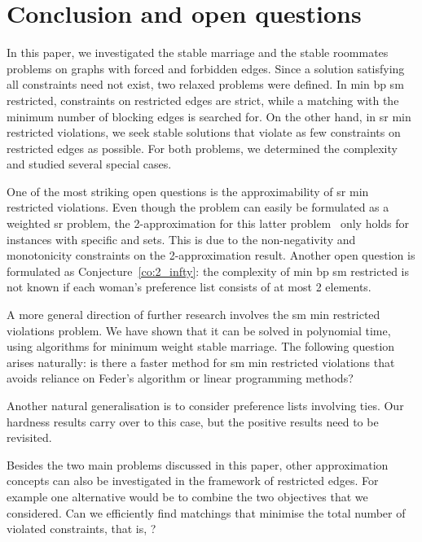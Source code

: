 \documentclass[preprint,12pt]{elsarticle}
\begin{document}
\section{Conclusion and open questions}
\label{sec:conc}
    In this paper, we investigated the stable marriage and the stable roommates problems on graphs with forced and forbidden edges. Since a solution satisfying all constraints need not exist, two relaxed problems were defined. In {\sc min bp sm restricted}, constraints on restricted edges are strict, while a matching with the  minimum number of blocking edges is searched for. On the other hand, in {\sc sr min restricted violations}, we seek stable solutions that violate as few constraints on restricted edges as possible. For both problems, we determined the complexity and studied several special cases.
    
One of the most striking open questions is the approximability of {\sc sr min restricted violations}. Even though the problem can easily be formulated as a weighted {\sc sr} problem, the 2-approximation for this latter problem~\cite{TS97,TS98} only holds for instances with specific  and  sets. This is due to the non-negativity and monotonicity constraints on the 2-approximation result. Another open question is formulated as Conjecture~\ref{co:2_infty}: the complexity of {\sc min bp sm restricted} is not known if each woman's preference list consists of at most 2 elements.

A more general direction of further research involves the {\sc sm min restricted violations} problem. We have shown that it can be solved in polynomial time, using algorithms for minimum weight stable marriage. The following question arises naturally: is there a faster method for {\sc sm min restricted violations} that avoids reliance on Feder's algorithm or linear programming methods?

Another natural generalisation is to consider preference lists involving ties. Our hardness results carry over to this case, but the positive results need to be revisited.

Besides the two main problems discussed in this paper, other approximation concepts can also be investigated in the framework of restricted edges.  For example one alternative would be to combine the two objectives that we considered.  Can we efficiently find matchings that minimise the total number of violated constraints, that is, ?
\end{document}
